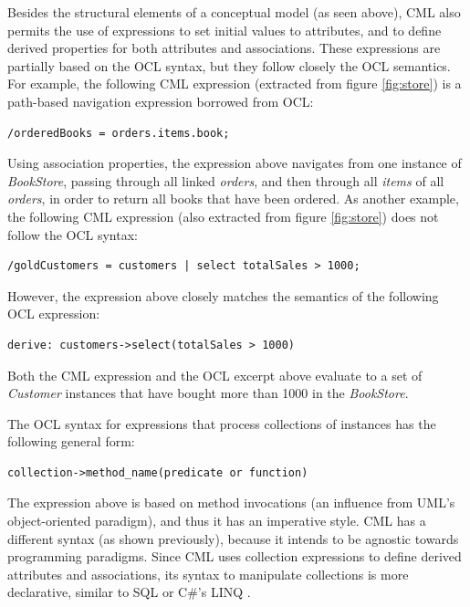 Besides the structural elements of a conceptual model (as seen above),
CML also permits the use of expressions to set initial values to attributes,
and to define derived properties for both attributes and associations.
These expressions are partially based on the OCL \cite{ocl} syntax,
but they follow closely the OCL semantics.
For example, the following CML expression (extracted from figure \ref{fig:store}) is a path-based navigation expression borrowed from OCL:

\verbatimfont{\scriptsize}
\begin{verbatim}
/orderedBooks = orders.items.book;
\end{verbatim}

Using association properties, the expression above navigates from one instance of \emph{BookStore}, passing through all linked \emph{orders}, and then through all \emph{items} of all \emph{orders}, in order to return all books that have been ordered.
As another example,
the following CML expression (also extracted from figure \ref{fig:store}) does not follow the OCL syntax:

\verbatimfont{\scriptsize}
\begin{verbatim}
/goldCustomers = customers | select totalSales > 1000;
\end{verbatim}

However, the expression above closely matches the semantics of the following OCL expression:

\verbatimfont{\scriptsize}
\begin{verbatim}
derive: customers->select(totalSales > 1000)
\end{verbatim}

Both the CML expression and the OCL excerpt above evaluate to a set of \emph{Customer} instances
that have bought more than 1000 in the \emph{BookStore}.

The OCL syntax for expressions that process collections of instances has the following general form:

\verbatimfont{\scriptsize}
\begin{verbatim}
collection->method_name(predicate or function)
\end{verbatim}

The expression above is based on method invocations
(an influence from UML's object-oriented paradigm),
and thus it has an imperative style. CML has a different syntax (as shown previously),
because it intends to be agnostic towards programming paradigms.
Since CML uses collection expressions to define derived attributes and associations,
its syntax to manipulate collections is more declarative,
similar to SQL \cite{sql} or C\#'s LINQ \cite{torgersen}.

